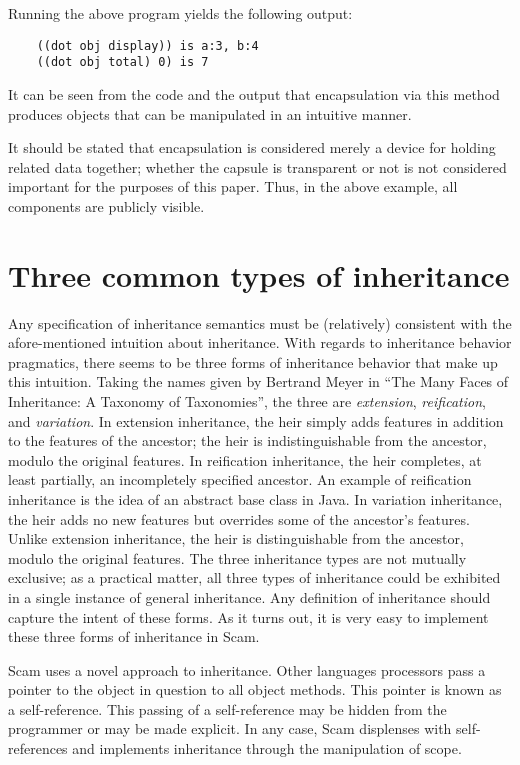 Running the above program yields the following output:

\begin{verbatim}
    ((dot obj display)) is a:3, b:4
    ((dot obj total) 0) is 7
\end{verbatim}

It can be seen from the code and the output that encapsulation via this
method produces objects that can be manipulated in an intuitive manner.

It should be stated that encapsulation is considered merely a device for
holding related data together; whether the capsule is transparent or
not is not considered important for the purposes of this paper. Thus,
in the above example, all components are publicly visible. 

\section{Three common types of inheritance}

Any specification of inheritance semantics must be (relatively)
consistent with the afore-mentioned intuition about inheritance.
With regards to inheritance behavior pragmatics, there seems to be three
forms of inheritance behavior that make up this intuition.  Taking the
names given by Bertrand Meyer in ``The Many Faces of Inheritance: 
A Taxonomy of Taxonomies'',
the three are {\it extension},
{\it reification}, and {\it variation}.  In extension inheritance,
the heir simply adds features in addition to the features of the
ancestor; the heir is indistinguishable from the ancestor, modulo the
original features.  In reification inheritance, the heir completes,
at least partially, an incompletely specified ancestor.  An example of
reification inheritance is the idea of an abstract base class in Java.
In variation inheritance, the heir adds no new features but overrides
some of the ancestor's features. Unlike extension inheritance, the heir
is distinguishable from the ancestor, modulo the original features. The
three inheritance types are not mutually exclusive; as a practical matter,
all three types of inheritance could be exhibited in a single instance
of general inheritance.  Any definition of inheritance should capture
the intent of these forms.
As it turns out, it is very easy to implement these three forms
of inheritance in Scam.

Scam uses a novel approach to inheritance. Other languages 
processors pass
a pointer to the object in question to all object methods.
This pointer is known as a self-reference. This passing of
a self-reference may be hidden from the programmer or may
be made explicit. In any case, Scam displenses with self-references
and implements inheritance through the manipulation of scope.

